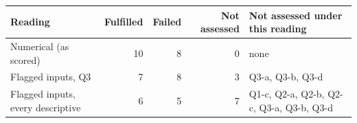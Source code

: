 \begin{tabular}{@{}lrrrl@{}}\toprule
Reading & Fulfilled & Failed & Not assessed & Not assessed under this reading \\\midrule
Numerical (as scored) & 10 & 8 & 0 & none \\
Flagged inputs, Q3 & 7 & 8 & 3 & Q3-a, Q3-b, Q3-d \\
Flagged inputs, every descriptive & 6 & 5 & 7 & Q1-c, Q2-a, Q2-b, Q2-c, Q3-a, Q3-b, Q3-d \\
\bottomrule\end{tabular}
